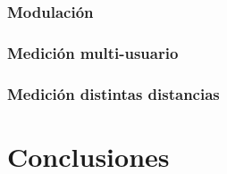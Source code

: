 \documentclass[a4paper,10pt]{report}
\begin{document}
\subsubsection{Modulación}
\subsubsection{Medición multi-usuario}
\subsubsection{Medición distintas distancias}

\section{Conclusiones}

%


\end{document}
